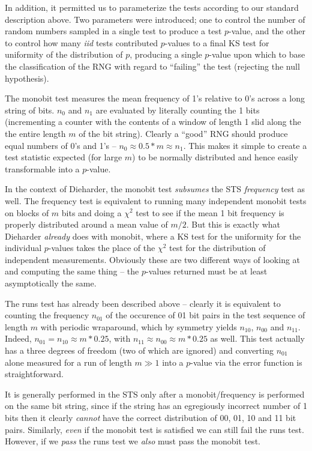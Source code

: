 \documentclass[12pt]{book}
\begin{document}
In addition, it permitted us to parameterize the tests according to our
standard description above.  Two parameters were introduced; one to
control the number of random numbers sampled in a single test to produce
a test $p$-value, and the other to control how many {\em iid} tests
contributed $p$-values to a final KS test for uniformity of the
distribution of $p$, producing a single $p$-value upon which to base the
classification of the RNG with regard to ``failing'' the test (rejecting
the null hypothesis).

The monobit test measures the mean frequency of 1's relative to 0's
across a long string of bits.  $n_0$ and $n_1$ are evaluated by
literally counting the 1 bits (incrementing a counter with the contents
of a window of length 1 slid along the the entire length $m$ of the bit
string).  Clearly a ``good'' RNG should produce equal numbers of 0's and
1's -- $n_0 \approx 0.5*m \approx n_1$.  This makes it simple to create
a test statistic expected (for large $m$) to be normally distributed and
hence easily transformable into a $p$-value.

In the context of Dieharder, the monobit test {\em subsumes} the STS
{\em frequency} test as well.  The frequency test is equivalent to
running many independent monobit tests on blocks of $m$ bits and doing a
$\chi^2$ test to see if the mean 1 bit frequency is properly distributed
around a mean value of $m/2$.  But this is exactly what Dieharder {\em
already} does with monobit, where a KS test for the uniformity for the
individual $p$-values takes the place of the $\chi^2$ test for the
distribution of independent measurements.  Obviously these are two
different ways of looking at and computing the same thing -- the
$p$-values returned must be at least asymptotically the same.

The runs test has already been described above -- clearly it is
equivalent to counting the frequency $n_{01}$ of the occurence of 01 bit
pairs in the test sequence of length $m$ with periodic wraparound, which
by symmetry yields $n_{10}$, $n_{00}$ and $n_{11}$.  Indeed, $n_{01} =
n_{10} \approx m*0.25$, with $n_{11} \approx n_{00} \approx m*0.25$ as
well.  This test actually has a three degrees of freedom (two of which
are ignored) and converting $n_{01}$ alone measured for a run of length
$m \gg 1$ into a $p$-value via the error function is straightforward.

It is generally performed in the STS only after a monobit/frequency is
performed on the same bit string, since if the string has an egregiously
incorrect number of 1 bits then it clearly {\em cannot} have the correct
distribution of 00, 01, 10 and 11 bit pairs.  Similarly, {\em even} if
the monobit test is satisfied we can still fail the runs test.  However,
if we {\em pass} the runs test we {\em also} must pass the monobit test.
\end{document}
